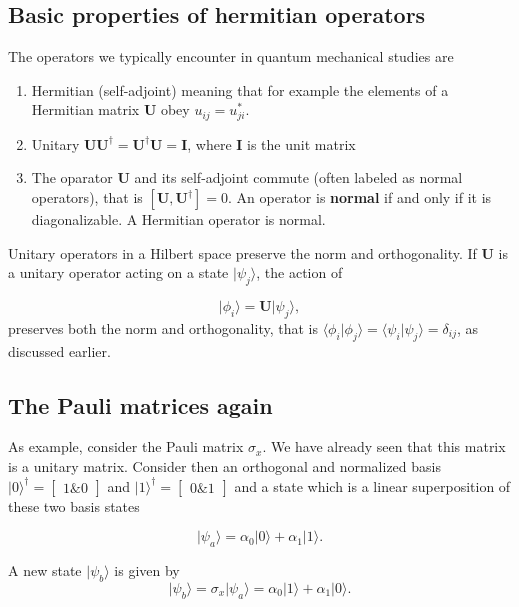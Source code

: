 \subsection{Basic properties of hermitian operators}

The operators we typically encounter in quantum mechanical studies are
\begin{enumerate}
\item Hermitian (self-adjoint) meaning that for example the elements of a Hermitian matrix $\bm{U}$ obey $u_{ij}=u_{ji}^*$.

\item Unitary $\bm{U}\bm{U}^{\dagger}=\bm{U}^{\dagger}\bm{U}=\bm{I}$, where $\bm{I}$ is the unit matrix

\item The oparator $\bm{U}$ and its self-adjoint commute (often labeled as normal operators), that is  $[\bm{U},\bm{U}^{\dagger}]=0$. An operator is \textbf{normal} if and only if it is diagonalizable. A Hermitian operator is normal.
\end{enumerate}

\noindent
Unitary operators in a Hilbert space preserve the norm and orthogonality. If $\bm{U}$ is a unitary operator acting on a state $\vert \psi_j\rangle$, the action of

\[
\vert \phi_i\rangle=\bm{U}\vert \psi_j\rangle,
\]
preserves both the norm and orthogonality, that is $\langle \phi_i \vert \phi_j\rangle=\langle \psi_i \vert \psi_j\rangle=\delta_{ij}$, as discussed earlier.

\subsection{The Pauli matrices again}

As example, consider the Pauli matrix $\sigma_x$. We have already seen that this matrix is a unitary matrix. Consider then an orthogonal and normalized basis $\vert 0\rangle^{\dagger} =\begin{bmatrix} 1 {\&} 0\end{bmatrix}$ and $\vert 1\rangle^{\dagger} =\begin{bmatrix} 0 {\&} 1\end{bmatrix}$ and a state which is a linear superposition of these two basis states

\[
\vert \psi_a\rangle=\alpha_0\vert 0\rangle +\alpha_1\vert 1\rangle.
\]

A new state $\vert \psi_b\rangle$ is given by
\[
\vert \psi_b\rangle=\sigma_x\vert \psi_a\rangle=\alpha_0\vert 1\rangle +\alpha_1\vert 0\rangle.
\]

